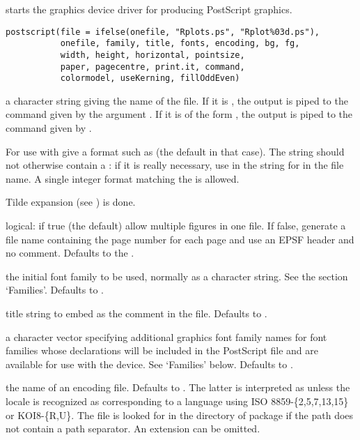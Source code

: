 %
\begin{Description}\relax
{} starts the graphics device driver for producing
PostScript graphics.
\end{Description}
%
\begin{Usage}
\begin{verbatim}
postscript(file = ifelse(onefile, "Rplots.ps", "Rplot%03d.ps"),
           onefile, family, title, fonts, encoding, bg, fg,
           width, height, horizontal, pointsize,
           paper, pagecentre, print.it, command,
           colormodel, useKerning, fillOddEven)
\end{verbatim}
\end{Usage}
%
\begin{Arguments}
\begin{ldescription}
\item[\code{file}] a character string giving the name of the file.  If it is
, the output is piped to the command given by the argument
.
If it is of the form , the output is piped to the
command given by .

For use with  give a  format such
as  (the default in that case).  The string
should not otherwise contain a \code{\%}: if it is really necessary,
use \code{\%\%} in the string for \code{\%} in the file name.
A single integer format matching the 
 is allowed.

Tilde expansion (see ) is done.

\item[\code{onefile}] logical: if true (the default) allow multiple figures
in one file.  If false, generate a file name containing the page
number for each page and use an EPSF header and no
 comment.  Defaults to the .
\item[\code{family}] the initial font family to be used, normally as a
character string.  See the section `Families'.  Defaults to
.
\item[\code{title}] title string to embed as the  comment in the
file.  Defaults to .
\item[\code{fonts}] a character vector specifying additional \R{} graphics font
family names for font families whose declarations will be included
in the PostScript file and are available for use with the device.
See `Families' below.  Defaults to .
\item[\code{encoding}] the name of an encoding file.  Defaults to
.  The latter is interpreted as
 unless the locale is recognized as
corresponding to a language using ISO 8859-\{2,5,7,13,15\} or KOI8-\{R,U\}.
The file is looked for in the  directory of package
 if the path does not contain a path separator.  An
extension  can be omitted.


\end{ldescription}
\end{Arguments}
